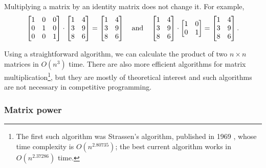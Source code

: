 \begin{samepage}
Multiplying a matrix by an identity matrix
does not change it. For example,
\[
 \begin{bmatrix}
  1 & 0 & 0 \\
  0 & 1 & 0 \\
  0 & 0 & 1 \\
 \end{bmatrix}
\cdot
 \begin{bmatrix}
  1 & 4 \\
  3 & 9 \\
  8 & 6 \\
 \end{bmatrix}
=
 \begin{bmatrix}
  1 & 4 \\
  3 & 9 \\
  8 & 6 \\
 \end{bmatrix} \hspace{10px} \textrm{and} \hspace{10px}
 \begin{bmatrix}
  1 & 4 \\
  3 & 9 \\
  8 & 6 \\
 \end{bmatrix}
\cdot
 \begin{bmatrix}
  1 & 0 \\
  0 & 1 \\
 \end{bmatrix}
=
 \begin{bmatrix}
  1 & 4 \\
  3 & 9 \\
  8 & 6 \\
 \end{bmatrix}.
\]
\end{samepage}

Using a straightforward algorithm,
we can calculate the product of
two $n \times n$ matrices
in $O(n^3)$ time.
There are also more efficient algorithms
for matrix multiplication\footnote{The first such
algorithm was Strassen's algorithm,
published in 1969 \cite{str69},
whose time complexity is $O(n^{2.80735})$;
the best current algorithm \cite{gal14}
works in $O(n^{2.37286})$ time.},
but they are mostly of theoretical interest
and such algorithms are not necessary
in competitive programming.


\subsubsection{Matrix power}

